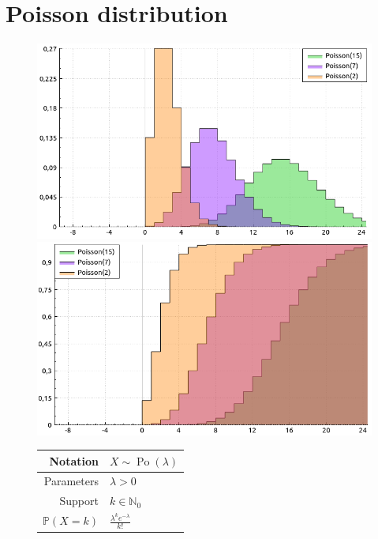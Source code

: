 \documentclass[a4paper,11pt]{article}
\theoremstyle{plain}
\theoremstyle{definition}
\newcommand{\MP}{\mathbb{P}}
\newcommand{\MN}{\mathbb{N}}
\begin{document}
	\section{Poisson distribution}
		\begin{figure}[!htb]\centering
			\begin{minipage}{0.55\textwidth}
				\includegraphics[width=\linewidth, right]{poisson_pmf}
				\captionsetup{labelformat=empty}
				\includegraphics[width=\linewidth, right]{poisson_cdf}
				\captionsetup{labelformat=empty}
			\end{minipage}
			\begin{minipage}{0.4\textwidth}
				\begin{tabular}{| r | l |}
					\hline
					Notation & $ X \sim \operatorname{Po}(\lambda) $ \\
					\hline
					Parameters & $\lambda > 0$ \\
					\hline
					Support & $ k \in \MN_0 $  \\
					\hline
					$\MP(X = k)$ & $\frac{\lambda^k e^{-\lambda}}{k!}$ \\

\end{tabular}
\end{minipage}
\end{figure}
\end{document}
